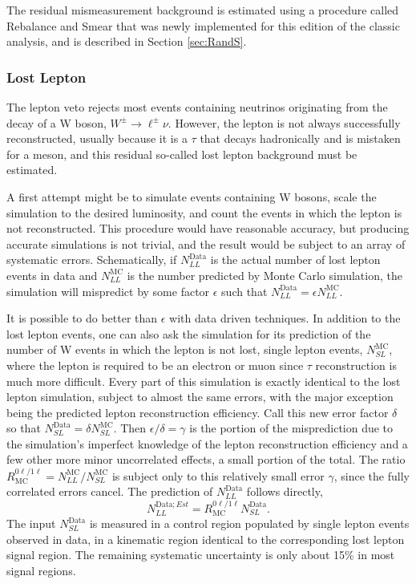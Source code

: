     The residual mismeasurement background is estimated using a procedure called Rebalance and Smear that was newly implemented for this edition of the classic analysis, and is described in Section \ref{sec:RandS}.
    
    \subsubsection{Lost Lepton} \label{sec:MT2lostlep}

    The lepton veto rejects most events containing neutrinos originating from the decay of a W boson, $W^{\pm}\rightarrow \ell^{\pm}\nu$.
    However, the lepton is not always successfully reconstructed, usually because it is a $\tau$ that decays hadronically and is mistaken for a meson, and this residual so-called lost lepton background must be estimated. 

    A first attempt might be to simulate events containing W bosons, scale the simulation to the desired luminosity, and count the events in which the lepton is not reconstructed.
    This procedure would have reasonable accuracy, but producing accurate simulations is not trivial, and the result would be subject to an array of systematic errors.
    Schematically, if $N_{LL}^{\mathrm{Data}}$ is the actual number of lost lepton events in data and $N_{LL}^{\mathrm{MC}}$ is the number predicted by Monte Carlo simulation, the simulation will mispredict by some factor $\epsilon$ such that $N_{LL}^{\mathrm{Data}} = \epsilon N_{LL}^{\mathrm{MC}}$.

    It is possible to do better than $\epsilon$ with data driven techniques.
    In addition to the lost lepton events, one can also ask the simulation for its prediction of the number of W events in which the lepton is not lost, single lepton events, $N_{SL}^{\mathrm{MC}}$, where the lepton is required to be an electron or muon since $\tau$ reconstruction is much more difficult.
    Every part of this simulation is exactly identical to the lost lepton simulation, subject to almost the same errors, with the major exception being the predicted lepton reconstruction efficiency.
    Call this new error factor $\delta$ so that $N_{SL}^{\mathrm{Data}}=\delta N_{SL}^{\mathrm{MC}}$.
    Then $\epsilon/\delta = \gamma$ is the portion of the misprediction due to the simulation's imperfect knowledge of the lepton reconstruction efficiency and a few other more minor uncorrelated effects, a small portion of the total.
    The ratio $R_{\mathrm{MC}}^{0\ell/1\ell} = N_{LL}^{\mathrm{MC}} / N_{SL}^{\mathrm{MC}}$ is subject only to this relatively small error $\gamma$, since the fully correlated errors cancel.
    The prediction of $N_{LL}^{\mathrm{Data}}$ follows directly,
    \begin{equation}
      N_{LL}^{\mathrm{Data};Est} = R_{\mathrm{MC}}^{0\ell/1\ell} N_{SL}^{\mathrm{Data}}.
    \end{equation}
    The input $N_{SL}^{\mathrm{Data}}$ is measured in a control region populated by single lepton events observed in data, in a kinematic region identical to the corresponding lost lepton signal region.
    The remaining systematic uncertainty is only about 15\% in most signal regions.

